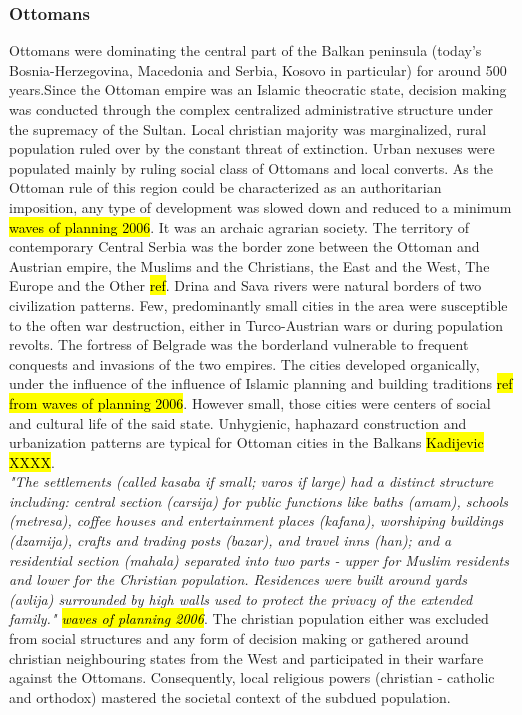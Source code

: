 \documentclass[11pt]{report}
\begin{document}
\subsubsection{Ottomans}
Ottomans were dominating the central part of the Balkan peninsula (today’s Bosnia-Herzegovina,  Macedonia  and  Serbia,  Kosovo  in  particular) for around 500 years.\footnotemark Since the Ottoman empire was an Islamic theocratic state, decision making was conducted through the complex centralized administrative structure under the supremacy of the Sultan. Local christian majority was marginalized, rural population ruled over by the constant threat of extinction. Urban nexuses were populated mainly by ruling social class of Ottomans and local converts. As the Ottoman rule of this region could be characterized as an authoritarian imposition, any type of development was slowed down and reduced to a minimum \hl{waves of planning 2006}. It was an archaic agrarian society. The territory of contemporary Central Serbia was the border zone between the Ottoman and Austrian empire, the Muslims and the Christians, the East and the West, The Europe and the Other \hl{ref}. Drina and Sava rivers were natural borders of two civilization patterns. Few, predominantly small cities in the area were susceptible to the often war destruction, either in Turco-Austrian wars or during population revolts. The fortress of Belgrade was the borderland vulnerable to frequent conquests and invasions of the two empires. The cities developed organically, under the influence of the influence of Islamic planning and building traditions \hl{ref from waves of planning 2006}. However small, those cities were centers of social and cultural life of the said state. Unhygienic, haphazard construction and urbanization patterns are typical for Ottoman cities in the Balkans \hl{Kadijevic XXXX}. 
\\ 
\textit{"The settlements (called kasaba  if  small;  varos  if  large)  had  a  distinct  structure  including:  central section (carsija) for public functions like baths (amam), schools (metresa), coffee houses and entertainment  places  (kafana),  worshiping  buildings  (dzamija),  crafts  and  trading  posts (bazar), and travel inns (han); and a residential section (mahala) separated into two parts - upper for Muslim residents and lower for the Christian population. Residences were built around yards (avlija) surrounded by high walls used to protect the privacy of the extended family." \hl{waves of planning 2006}}. The christian population either was excluded from social structures and any form of decision making or gathered around christian neighbouring states from the West and participated in their warfare against the Ottomans. Consequently, local religious powers (christian - catholic and orthodox) mastered the societal context of the subdued population.
\end{document}
